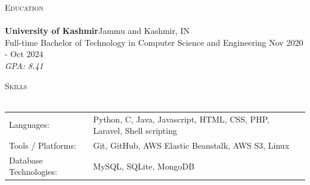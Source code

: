 \documentclass[a4paper]{article}
\newcommand{\lineunder} {
    \vspace*{-8pt} \\
    \hspace*{-18pt} \hrulefill \\
}
\newcommand{\header} [1] {
    {\hspace*{-18pt}\vspace*{6pt} \textsc{#1}}
    \vspace*{-6pt} \lineunder
}
\begin{document}
    \vspace{2mm}

      \header{Education}
      \vspace{2mm}
      \textbf{University of Kashmir}\hfill Jammu and Kashmir, IN\\
Full-time Bachelor of Technology in Computer Science and Engineering \hfill Nov 2020 - Oct 2024\\
{\sl GPA: 8.41}\\
\vspace{2mm}

  \header{Skills}
  \vspace{2mm}
  \begin{longtable}{p{4cm}p{12cm}}
  Languages: & Python, C, Java, Javascript, HTML, CSS, PHP, Laravel, Shell scripting \\
  Tools / Platforms: & Git, GitHub, AWS Elastic Beanstalk, AWS S3, Linux \\
  Database Technologies: & MySQL, SQLite, MongoDB \\
  \end{longtable}
  \vspace{1mm}
\end{document}
